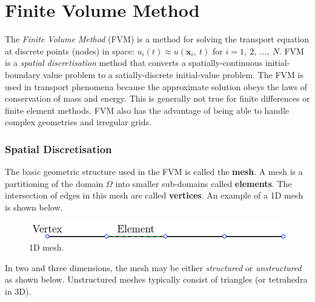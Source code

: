 \documentclass{article}
\begin{document}
\part{Finite Volume Method}
The \textit{Finite Volume Method} (FVM) is a method for solving the
transport equation at discrete points (nodes) in space: \(u_i\left( t
\right) \approx u\left( \symbf{x}_i,\: t \right)\) for \(i = 1,\: 2,\:
\ldots,\: N\). FVM is a \textit{spatial discretisation} method that
converts a spatially-continuous initial-boundary value problem to a
satially-discrete initial-value problem. The FVM is used in transport
phenomena because the approximate solution obeys the laws of
conservation of mass and energy. This is generally not true for finite
differences or finite element methods. FVM also has the advantage of
being able to handle complex geometries and irregular grids.
\section{Spatial Discretisation}
The basic geometric structure used in the FVM is called the
\textbf{mesh}. A mesh is a partitioning of the domain \(\Omega\) into
smaller sub-domains called \textbf{elements}. The intersection of edges
in this mesh are called \textbf{vertices}. An example of a 1D mesh is
shown below.
\begin{figure}[H]
    \centering
    \includegraphics[width = 0.8\linewidth]{figures/1d-mesh.pdf}
    \caption{1D mesh.} %
\end{figure}
In two and three dimensions, the mesh may be either \textit{structured}
or \textit{unstructured} as shown below. Unstructured meshes typically
consist of triangles (or tetrahedra in 3D).
\end{document}
